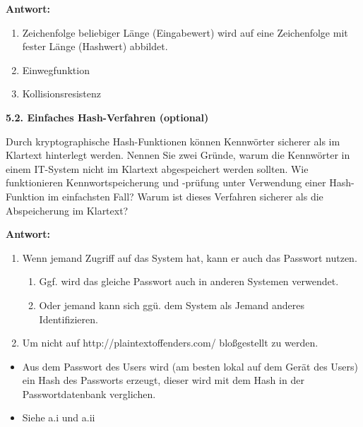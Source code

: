 \documentclass[ngerman]{fbi-aufgabenblatt}
\begin{document}
\textbf{Antwort:}
    \begin{enumerate}
    \item Zeichenfolge beliebiger Länge (Eingabewert) wird auf eine Zeichenfolge mit fester Länge (Hashwert) abbildet.
    \item Einwegfunktion
    \item Kollisionsresistenz
    \end{enumerate}

\textbf{5.2. Einfaches Hash-Verfahren (optional)}

Durch kryptographische Hash-Funktionen können Kennwörter sicherer als im Klartext hinterlegt werden. Nennen Sie zwei Gründe, warum die Kennwörter in einem IT-System nicht im Klartext abgespeichert werden sollten. Wie funktionieren Kennwortspeicherung und -prüfung unter Verwendung einer Hash-Funktion im einfachsten Fall? Warum ist dieses Verfahren sicherer als die Abspeicherung im Klartext?

\textbf{Antwort:}
   \begin{enumerate}
    \item Wenn jemand Zugriff auf das System hat, kann er auch das Passwort nutzen. 
    \begin{enumerate}
    \item Ggf. wird das gleiche Passwort auch in anderen Systemen verwendet.
    \item Oder jemand kann sich ggü. dem System als Jemand anderes Identifizieren.
    \end{enumerate}
    \item Um nicht auf http://plaintextoffenders.com/ bloßgestellt zu werden.
    \end{enumerate} 
    
    \begin{itemize}
    \item Aus dem Passwort des Users wird (am besten lokal auf dem Gerät des Users) ein Hash des Passworts erzeugt, dieser wird mit dem Hash in der Passwortdatenbank verglichen.
    \item Siehe a.i und a.ii
    \end{itemize}
\end{document}
